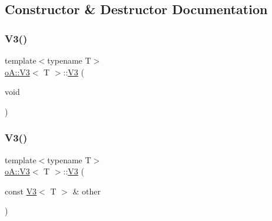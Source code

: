 \subsection{Constructor \& Destructor Documentation}
\mbox{\label{structo_a_1_1_v3_af7d2e9a3d4eecae6bdd7adf7dd1a691b}} 
\subsubsection{\texorpdfstring{V3()}{V3()}\hspace{0.1cm}{\footnotesize\ttfamily [1/3]}}
{\footnotesize\ttfamily template$<$typename T$>$ \\
\mbox{\hyperlink{structo_a_1_1_v3}{o\+A\+::\+V3}}$<$ T $>$\+::\mbox{\hyperlink{structo_a_1_1_v3}{V3}} (\begin{DoxyParamCaption}\item[{void}]{ }\end{DoxyParamCaption})\hspace{0.3cm}{\ttfamily [default]}}

\mbox{\label{structo_a_1_1_v3_a8020feb017daf4289ee5f1b06d3ff952}} 
\subsubsection{\texorpdfstring{V3()}{V3()}\hspace{0.1cm}{\footnotesize\ttfamily [2/3]}}
{\footnotesize\ttfamily template$<$typename T$>$ \\
\mbox{\hyperlink{structo_a_1_1_v3}{o\+A\+::\+V3}}$<$ T $>$\+::\mbox{\hyperlink{structo_a_1_1_v3}{V3}} (\begin{DoxyParamCaption}\item[{const \mbox{\hyperlink{structo_a_1_1_v3}{V3}}$<$ T $>$ \&}]{other }\end{DoxyParamCaption})\hspace{0.3cm}{\ttfamily [inline]}}

\mbox{\label{structo_a_1_1_v3_a528741444df16de6e4839338ec9d2cf0}} 
